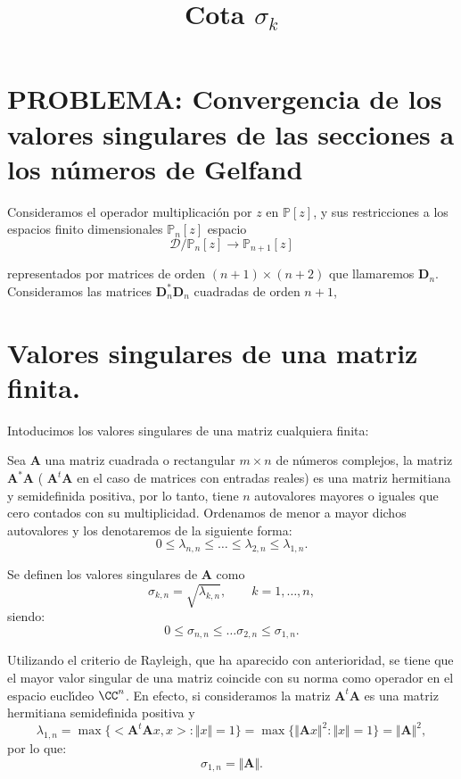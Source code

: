 \documentclass[12pt,a4paper]{article}
\title{Cota $\sigma_k$}
\author{}
\date{}
\begin{document}
\section{PROBLEMA: Convergencia de los valores singulares de las secciones a los n\'{u}meros de Gelfand}






\noindent Consideramos el operador multiplicación por $z$ en $\mathbb{P}[z]$, y sus restricciones a los espacios finito dimensionales $\mathbb{P}_{n}[z]
$ espacio 
$$
\mathcal{D}/\mathbb{P}_{n}[z] \to \mathbb{P}_{n+1}[z] 
$$

\noindent representados por matrices de orden $(n+1)\times (n+2)$ que llamaremos $\mathbf{D}_n$. Consideramos las matrices $\mathbf{D}^{*}_n\mathbf{D}_n$ cuadradas de orden $n+1$,





\section{Valores singulares de una matriz finita.} 

\noindent Intoducimos los valores singulares de una matriz cualquiera finita: 

\noindent Sea $\mathbf{A}$ una matriz cuadrada o rectangular $m\times n$ de n\'{u}meros complejos,  la matriz $\mathbf{A}^{*}\mathbf{A}$  ( $\mathbf{A}^{t}\mathbf{A}$ en el caso de matrices con entradas reales) es una matriz hermitiana y semidefinida positiva, por lo tanto, tiene $n$ autovalores mayores o iguales que cero contados con su multiplicidad. Ordenamos de menor a mayor dichos autovalores y los denotaremos de la siguiente forma:
$$
0 \leq \lambda_{n,n}\leq \dots \leq \lambda_{2,n} \leq \lambda_{1,n}. 
$$


\noindent Se definen los  valores singulares de $\mathbf{A}$ como 
$$
\sigma_{k,n}= \sqrt{\lambda_{k,n}}, \qquad k=1,\dots,n,
$$
\noindent siendo: 
$$
0 \leq \sigma_{n,n} \leq \dots \sigma_{2,n} \leq \sigma_{1,n}.
$$

\noindent Utilizando el criterio de Rayleigh, que ha aparecido con anterioridad, se tiene que el mayor valor singular de una matriz coincide con su norma como operador en el espacio eucl\'{\i}deo $\CC^n$. En 
efecto, si consideramos la matriz $\mathbf{A}^{t}\mathbf{A}$ es una matriz hermitiana semidefinida positiva y 
$$
\lambda_{1,n}= 
\max \{ <\mathbf{A}^{t}\mathbf{A}x,x>: \Vert x \Vert =1 \}
= \max \{\Vert \mathbf{A} x \Vert^2 : \Vert x \Vert =1\}=
\Vert \mathbf{A} \Vert^2,
$$
\noindent por lo que:
$$
\sigma_{1,n} = \Vert \mathbf{A} \Vert. 
$$
\end{document}
